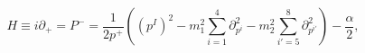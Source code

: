 \begin{equation}\label{LE}
H \equiv i\partial_+ = P^-
       = \frac1{2p^+} \left( (p^I)^2 - m_1^2
         \sum_{i =1}^4 \partial_{p^i}^2
         - m_2^2 \sum_{i'= 5}^8\partial_{p^{i'}}^2 \right)
         - \frac{\alpha}{2},
\end{equation}

